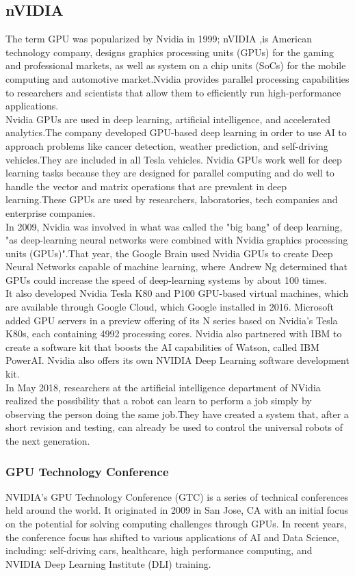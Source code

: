 \subsection{nVIDIA}
The term GPU was popularized by Nvidia in 1999; nVIDIA ,is American technology company, designs graphics processing units (GPUs) for the gaming and professional markets, as well as system on a chip units (SoCs) for the mobile computing and automotive market.Nvidia provides parallel processing capabilities to researchers and scientists that allow them to efficiently run high-performance applications.\cite{web009} \\
Nvidia GPUs are used in deep learning, artificial intelligence, and accelerated analytics.The company developed GPU-based deep learning in order to use AI to approach problems like cancer detection, weather prediction, and self-driving vehicles.They are included in all Tesla vehicles. Nvidia GPUs work well for deep learning tasks because they are designed for parallel computing and do well to handle the vector and matrix operations that are prevalent in deep learning.These GPUs are used by researchers, laboratories, tech companies and enterprise companies.\\
In 2009, Nvidia was involved in what was called the "big bang" of deep learning, "as deep-learning neural networks were combined with Nvidia graphics processing units (GPUs)".That year, the Google Brain used Nvidia GPUs to create Deep Neural Networks capable of machine learning, where Andrew Ng determined that GPUs could increase the speed of deep-learning systems by about 100 times.\\
It also developed Nvidia Tesla K80 and P100 GPU-based virtual machines, which are available through Google Cloud, which Google installed in 2016. Microsoft added GPU servers in a preview offering of its N series based on Nvidia's Tesla K80s, each containing 4992 processing cores. Nvidia also partnered with IBM to create a software kit that boosts the AI capabilities of Watson, called IBM PowerAI. Nvidia also offers its own NVIDIA Deep Learning software development kit.\\ In May 2018, researchers at the artificial intelligence department of NVidia realized the possibility that a robot can learn to perform a job simply by observing the person doing the same job.They have created a system that, after a short revision and testing, can already be used to control the universal robots of the next generation.
\subsubsection{GPU Technology Conference}
NVIDIA’s GPU Technology Conference (GTC) is a series of technical conferences held around the world. It originated in 2009 in San Jose, CA with an initial focus on the potential for solving computing challenges through GPUs. In recent years, the conference focus has shifted to various applications of AI and Data Science, including: self-driving cars, healthcare, high performance computing, and NVIDIA Deep Learning Institute (DLI) training.
